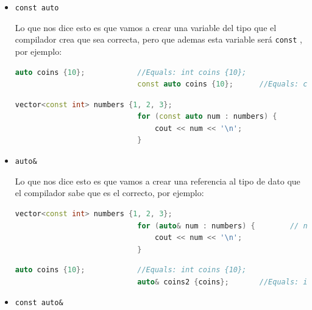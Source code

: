 \documentclass[12pt, fleqn]{report}                             %
\theoremstyle{break}                                            %
\newcommand{\textCode}[1]  { \texttt{#1} }                      %
\begin{document}
                \begin{itemize}
                    \item \textCode{const auto}

                        Lo que nos dice esto es que vamos a crear una variable del tipo que el compilador crea
                        que sea correcta, pero que ademas esta variable será \textCode{const}, por ejemplo:
                        \begin{lstlisting}[language=C++, gobble=28]
                            auto coins {10};            //Equals: int coins {10};
                            const auto coins {10};      //Equals: const int coins {10};
                        \end{lstlisting}

                        \begin{lstlisting}[language=C++, gobble=28]
                            vector<const int> numbers {1, 2, 3};
                            for (const auto num : numbers) {        // num is const int
                                cout << num << '\n';
                            }
                        \end{lstlisting}

                    \item \textCode{auto\&}
                    
                        Lo que nos dice esto es que vamos a crear una referencia al tipo de dato
                        que el compilador sabe que es el correcto, por ejemplo:
                        \begin{lstlisting}[language=C++, gobble=28]
                            vector<const int> numbers {1, 2, 3};
                            for (auto& num : numbers) {        // num is int&
                                cout << num << '\n';
                            }
                        \end{lstlisting}

                        \begin{lstlisting}[language=C++, gobble=28]
                            auto coins {10};            //Equals: int coins {10};
                            auto& coins2 {coins};       //Equals: int& coins2 {coins};
                        \end{lstlisting}

                    \item \textCode{const auto\&}
                    

\end{itemize}
\end{document}
